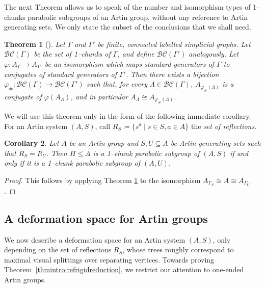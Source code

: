 \documentclass[svgnames]{amsart}
\theoremstyle{plain}
\newtheorem{thm}{Theorem}[section]
\newtheorem{cor}[thm]{Corollary}
\theoremstyle{definition}
\newcommand{\BC}{\mathcal{BC}}
\renewcommand{\phi}{\varphi}
\begin{document}
\noindent The next Theorem allows us to speak of the number and isomorphism types of 1--chunks parabolic subgroups of an Artin group, without any reference to Artin generating sets. We only state the subset of the conclusions that we shall need.
\begin{thm}[{\cite[Theorem~5.6]{JonManSar_JSJSpl}}]\label{thm:iso_invariance}
     Let $\Gamma$ and $\Gamma'$ be finite, connected labelled simplicial graphs. Let $\BC(\Gamma)$ be the set of 1--chunks of $\Gamma$, and define $\BC(\Gamma')$ analogously. Let $\phi\colon A_\Gamma\to A_{\Gamma'}$ be an isomorphism which maps standard generators of $\Gamma$ to conjugates of standard generators of $\Gamma'$. Then there exists a bijection $\phi_\#\colon \BC(\Gamma)\to \BC(\Gamma')$ such that, for every $\Lambda\in \BC(\Gamma)$, $A_{\phi_\#(\Lambda)}$ is a conjugate of $\phi(A_{\Lambda})$, and in particular $A_{\Lambda}\cong A_{\phi_\#(\Lambda)}$.
\end{thm}

\noindent We will use this theorem only in the form of the following immediate corollary. For an Artin system $(A,S)$, call $R_S \coloneq  \{s^a \mid s \in S, a \in A\}$ the \emph{set of reflections}.

\begin{cor}\label{cor:same_parabolics}
    Let $A$ be an Artin group and $S, U \subseteq A$ be Artin generating sets such that $R_S = R_U$. Then $H \le A$ is a 1--chunk parabolic subgroup of $(A,S)$ if and only if it is a 1--chunk parabolic subgroup of $(A,U)$. 
\end{cor}
\begin{proof}
    This follows by applying Theorem \ref{thm:iso_invariance} to the isomorphism $A_{\Gamma_S} \cong A \cong A_{\Gamma_U}$.
\end{proof}



\subsection{A deformation space for Artin groups}\label{sec:defspace_for_artin}
We now describe a deformation space for an Artin system $(A,S)$, only depending on the set of reflections $R_S$, whose trees roughly correspond to maximal visual splittings over separating vertices. Towards proving Theorem~\ref{thmintro:refrigidreduction}, we restrict our attention to one-ended Artin groups.
\end{document}
